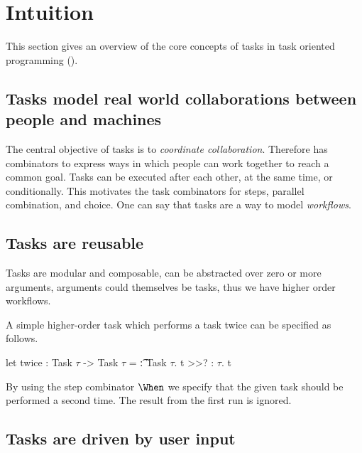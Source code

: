 


\section{Intuition}
\label{sec:intuition}

This section gives an overview of the core concepts of tasks in task oriented programming (\TOP).



\subsection{Tasks model real world collaborations between people and machines}

The central objective of tasks is to \emph{coordinate collaboration}.
Therefore \TOPHAT has combinators to express ways in which people can work together to reach a common goal.
Tasks can be executed after each other, at the same time, or conditionally.
This motivates the task combinators for steps, parallel combination, and choice.
One can say that tasks are a way to model \emph{workflows}.



\subsection{Tasks are reusable}

Tasks are modular and composable,
can be abstracted over zero or more arguments,
arguments could themselves be tasks,
thus we have higher order workflows.

\begin{example}[Twice]

A simple higher-order task which performs a task twice can be specified as follows.
\begin{TASK}
  let twice : Task $\tau$ -> Task $\tau$ = \t : Task $\tau$.
    t >>? \x : $\tau$. t
\end{TASK}
By using the step combinator $\When$ we specify that the given task  should be performed a second time.
The result  from the first run is ignored.

\end{example}



\subsection{Tasks are driven by user input}

